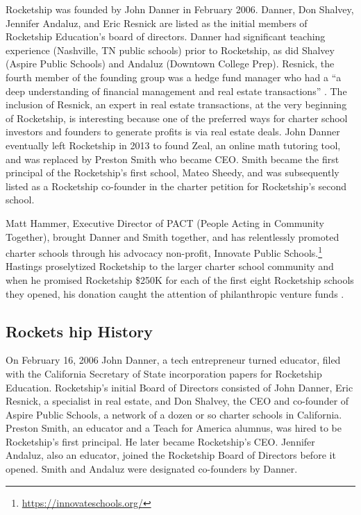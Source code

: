 Rocketship was founded by John Danner in February 2006. Danner, Don Shalvey, Jennifer Andaluz, and Eric Resnick are listed as the initial members of Rocketship Education's board of directors. Danner had significant teaching experience (Nashville, TN public schools) prior to Rocketship, as did Shalvey (Aspire Public Schools) and Andaluz (Downtown College Prep). Resnick, the fourth member of the founding group was a hedge fund manager who had a ``a deep understanding of financial management and real estate transactions'' \parencite[13]{Danner2006}. The inclusion of Resnick, an expert in real estate transactions, at the very beginning of Rocketship, is interesting because one of the preferred ways for charter school investors and founders to generate profits is via real estate deals. John Danner eventually left Rocketship in 2013 to found Zeal, an online math tutoring tool, and was replaced by Preston Smith who became CEO\@. Smith became the first principal of the Rocketship's first school, Mateo Sheedy, and was subsequently listed as a Rocketship co-founder in the charter petition for Rocketship's second school. %

Matt Hammer, Executive Director of PACT (People Acting in Community Together), brought Danner and Smith together, and has relentlessly promoted charter schools through his advocacy non-profit, Innovate Public  Schools.\footnote{\url{https://innovateschools.org/}} Hastings proselytized Rocketship to the larger charter school community and when he promised Rocketship \$250K for each of the first eight Rocketship schools they opened, his donation caught the attention of philanthropic venture funds \parencite[50]{Whitmire2014}. 

\subsection{Rockets hip History}\label{sec:history}\indent

On February 16, 2006 John Danner, a tech entrepreneur turned educator, filed with the California Secretary of State incorporation papers for Rocketship Education. Rocketship's initial Board of Directors consisted of John Danner, Eric Resnick, a specialist in real estate, and Don Shalvey, the CEO and co-founder of Aspire Public Schools, a network of a dozen or so charter schools in California. Preston Smith, an educator and a Teach for America alumnus, was hired to be Rocketship's first principal. He later became Rocketship's CEO. Jennifer Andaluz, also an educator, joined the Rocketship Board of Directors before it opened. Smith and Andaluz were designated co-founders by Danner.

